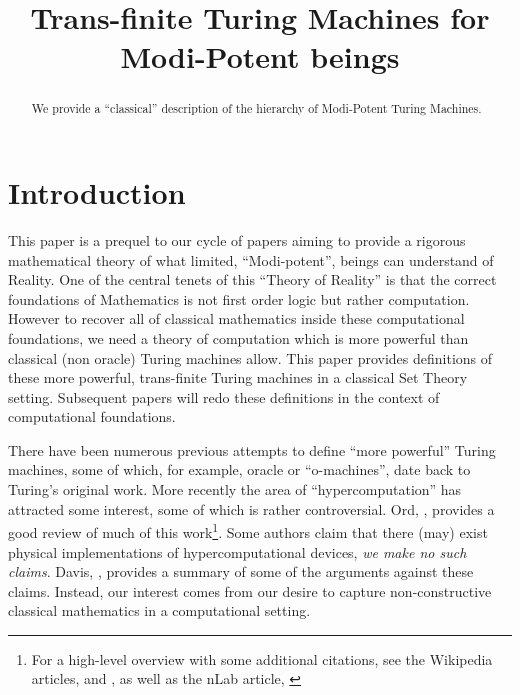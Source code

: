 \documentclass[a4paper,openany]{amsart}
\begin{document}
\sloppy

\title[Modi-Potent-Turing]{Trans-finite Turing Machines for Modi-Potent beings}

%

\begin{abstract}
We provide a ``classical'' description of the hierarchy of Modi-Potent Turing Machines.
\end{abstract} 
\maketitle 
\tableofcontents 


\section{Introduction}

This paper is a prequel to our cycle of papers aiming to provide a rigorous mathematical
theory of what limited, ``Modi-potent'', beings can understand of Reality. One of the
central tenets of this ``Theory of Reality'' is that the correct foundations of
Mathematics is not first order logic but rather computation. However to recover all of
classical mathematics inside these computational foundations, we need a theory of
computation which is more powerful than classical (non oracle) Turing machines allow. This
paper provides definitions of these more powerful, trans-finite Turing machines in a
classical Set Theory setting. Subsequent papers will redo these definitions in the context
of computational foundations.

There have been numerous previous attempts to define ``more powerful'' Turing machines,
some of which, for example, oracle or ``o-machines'', date back to Turing's original work.
More recently the area of ``hypercomputation'' has attracted some interest, some of which
is rather controversial. Ord, \cite{ord2006hyperComputation}, provides a good review of
much of this work\footnote{For a high-level overview with some additional citations, see
the Wikipedia articles, \cite{wikipedia2015hyperComputation} and
\cite{wikipedia2015superRecursiveAlgorithm}, as well as the nLab article,
\cite{nLab2015hyperComputation}}. Some authors claim that there (may) exist physical
implementations of hypercomputational devices, \emph{we make \emph{no} such claims}.
Davis, \cite{davis2004hyperComputation}, provides a summary of some of the arguments
against these claims. Instead, our interest comes from our desire to capture
non-constructive classical mathematics in a computational setting.
\end{document}
